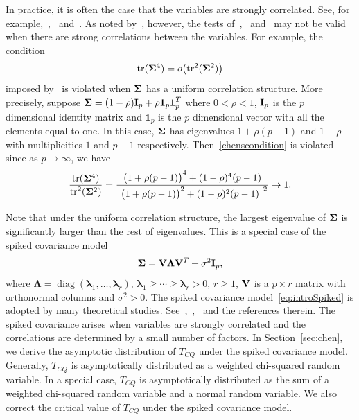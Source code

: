 \documentclass[3p]{elsarticle}
\DeclareMathOperator{\mytr}{tr}
\DeclareMathOperator{\mydiag}{diag}
\newcommand{\bfsym}[1]{\ensuremath{\boldsymbol{#1}}}
\def\blambda {\bfsym {\lambda}}        \def\bLambda {\bfsym {\Lambda}}
\theoremstyle{plain}
\theoremstyle{definition}
\theoremstyle{remark}
\begin{document}
In practice, it is often the case that the variables are strongly correlated.
See, for example,~\cite{Chen2011A},~\cite{Thulin2014A} and~\cite{Ma2015A}.
As noted by~\cite{Ma2015A}, however, the tests of~\cite{Bai1996Efiect},~\cite{Srivastava2008A} and~\cite{Chen2010A} may not be valid when there are strong correlations between the variables.
For example, the condition 
\begin{equation}\label{chenscondition}
    \mathrm{tr}(\bSigma^4)=o\big(\mathrm{tr}^2(\bSigma^2)\big)
\end{equation}
imposed by~\cite{Chen2010A} is violated when $\bSigma$ has a uniform correlation structure.
More precisely, suppose
$\bSigma=(1-\rho)\BI_p+\rho\textbf{1}_p \textbf{1}_p^T$ where $0<\rho<1$, $\mathbf{I}_p$ is the $p$ dimensional identity matrix and $\bm{1}_p$ is the $p$ dimensional vector with all the elements equal to one.
In this case, $\bSigma$ has eigenvalues $1+\rho(p-1) $ and $1-\rho$ with multiplicities $1$ and $p-1$ respectively. Then~\eqref{chenscondition} is violated since 
as $p\to \infty$, we have
$$
\frac{\mytr (\bSigma^4)}{\mytr^2(\bSigma^2)}=\frac{\big(1+\rho(p-1)\big)^4 + (1-\rho)^4 (p-1)}{\big[ \big(1+\rho(p-1)\big)^2+(1-\rho)^2 (p-1) \big]^2}\to 1.
$$

  Note that under the uniform correlation structure, the largest eigenvalue of $\bSigma$ is significantly larger than the rest of eigenvalues.
  This is a special case of the spiked covariance model
 \begin{equation}\label{eq:introSpiked}
 \bSigma =\BV\bLambda \BV^T +\sigma^2 \BI_p,
 \end{equation}
 where $\bLambda=\mydiag(\blambda_1,\ldots,\blambda_r)$, $\blambda_1\geq \cdots\geq \blambda_r>0$, $r\geq 1$, $\mathbf{V}$ is a $p\times r$ matrix with orthonormal columns and $\sigma^2>0$.
The spiked covariance model~\eqref{eq:introSpiked} is adopted by many theoretical studies. See~\cite{Cai2012Sparse},~\cite{Birnbaum2013},~\cite{Passemier2015} and the references therein.
The spiked covariance arises when variables are strongly correlated and the correlations are determined by a small number of factors.
 In Section~\ref{sec:chen}, we derive the asymptotic distribution of $T_{CQ}$ under the spiked covariance model. 
Generally, $T_{CQ}$ is asymptotically distributed as a weighted chi-squared random variable.
In a special case, $T_{CQ}$ is asymptotically distributed as the sum of a weighted chi-squared random variable and a normal random variable. 
We also correct the critical value of $T_{CQ}$ under the spiked covariance model.
\end{document}
